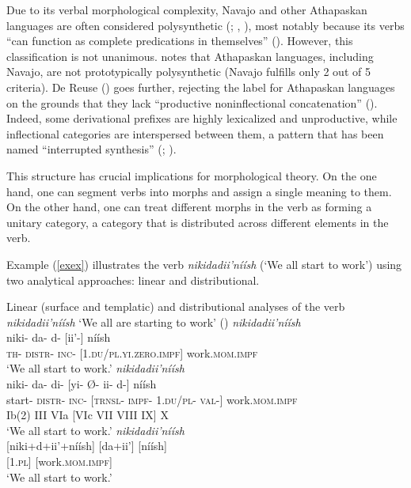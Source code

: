 Due to its verbal morphological complexity, Navajo and other Athapaskan languages are often considered polysynthetic (\cite{Mithun:1983te, Mithun:2015ta}; \cite{Fortescue:2007sv}, \cite{Sapir:1921bp}), most notably because its verbs ``can function as complete predications in themselves'' (\cite[38]{Mithun:2015ta}). However, this classification is not unanimous. \citet{Mattissen:2004go} notes that Athapaskan languages, including Navajo, are not prototypically polysynthetic (Navajo fulfills only 2 out of 5 criteria). De Reuse (\citeyear{de-Reuse:2009ij}) goes further, rejecting the label for Athapaskan languages on the grounds that they lack ``productive noninflectional concatenation'' (\citeyear[21--22]{de-Reuse:2009ij}). Indeed, some derivational prefixes are highly lexicalized and unproductive, while inflectional categories are interspersed between them, a pattern that has been named ``interrupted synthesis'' (\cite{Kari:1989ja}; \cite{Whorf:1956jt}).

This structure has crucial implications for morphological theory. On the one hand, one can segment verbs into morphs and assign a single meaning to them. On the other hand, one can treat different morphs in the verb as forming a unitary category, a category that is distributed across different elements in the verb.

Example (\ref{exex}) illustrates the verb \textit{nikidadii'níísh} (`We all start to work') using two analytical approaches: linear and distributional.

\ea \label{exex}
    Linear (surface and templatic) and distributional analyses of the verb \textit{nikidadii’níísh} `We all are starting to work' (\cite[634--635]{Young:1987uj})
	\ea \label{exsurf}
        \textit{nikidadii'níísh}\\
        \gll \textup{niki}- \textup{da}- \textup{d}- \textup{[ii’-]} \textup{níísh}\\
        \textsc{th}- \textsc{distr}- \textsc{inc}- [1.\textsc{du}/\textsc{pl}.\textsc{yi}.\textsc{zero}.\textsc{impf}] work.\textsc{mom}.\textsc{impf}\\
		\glt `We all start to work.'
	\ex \label{extempl}
        \textit{nikidadii'níísh}\\
        \glll \textup{niki}- \textup{da}- \textup{di}- \textup{[yi}- \textup{Ø}- \textup{ii}- \textup{d-]} \textup{níísh}\\
		start- \textsc{distr}- \textsc{inc}- [\textsc{trnsl}- \textsc{impf}- 1.\textsc{du}/\textsc{pl}- \textsc{val}-] work.\textsc{mom}.\textsc{impf}\\
        Ib(2) III VIa [VIc VII VIII IX] X\\
		\glt `We all start to work.'
    \ex \label{exdistrs}
        \textit{nikidadii'níísh}\\
        \gll\textup{[niki}\textup{+}\textup{d}\textup{+}\textup{ii’}\textup{+}\textup{níísh]} \textup{[da+ii’]}	\textup{[níísh]}\\
        [Transitional.Inception] [1.\textsc{pl}] [work.\textsc{mom}.\textsc{impf}]\\
		\glt `We all start to work.'
    \z
\z


